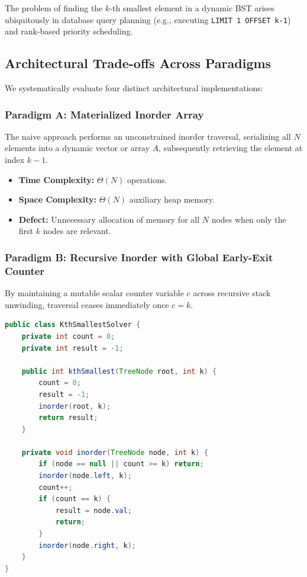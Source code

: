 \documentclass[10pt,twocolumn,letterpaper]{article}
\begin{document}
The problem of finding the $k$-th smallest element in a dynamic BST arises ubiquitously in database query planning (e.g., executing \texttt{LIMIT 1 OFFSET k-1}) and rank-based priority scheduling.

\subsection{Architectural Trade-offs Across Paradigms}

We systematically evaluate four distinct architectural implementations:

\subsubsection{Paradigm A: Materialized Inorder Array}
The naive approach performs an unconstrained inorder traversal, serializing all $N$ elements into a dynamic vector or array $A$, subsequently retrieving the element at index $k-1$.
\begin{itemize}
    \item \textbf{Time Complexity:} $\Theta(N)$ operations.
    \item \textbf{Space Complexity:} $\Theta(N)$ auxiliary heap memory.
    \item \textbf{Defect:} Unnecessary allocation of memory for all $N$ nodes when only the first $k$ nodes are relevant.
\end{itemize}

\subsubsection{Paradigm B: Recursive Inorder with Global Early-Exit Counter}
By maintaining a mutable scalar counter variable $c$ across recursive stack unwinding, traversal ceases immediately once $c = k$.

\begin{lstlisting}[language=Java,caption={Recursive Counter-Based $k$-th Smallest Lookup}]
public class KthSmallestSolver {
    private int count = 0;
    private int result = -1;

    public int kthSmallest(TreeNode root, int k) {
        count = 0;
        result = -1;
        inorder(root, k);
        return result;
    }

    private void inorder(TreeNode node, int k) {
        if (node == null || count >= k) return;
        inorder(node.left, k);
        count++;
        if (count == k) {
            result = node.val;
            return;
        }
        inorder(node.right, k);
    }
}
\end{lstlisting}
\end{document}
